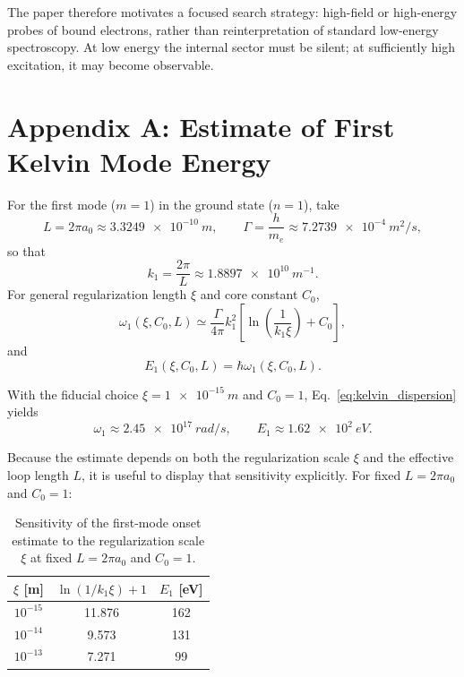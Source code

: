 \documentclass[pdflatex,sn-mathphys-num]{sn-jnl}
\begin{document}
        The paper therefore motivates a focused search strategy: high-field or high-energy probes of bound electrons, rather than reinterpretation of standard low-energy spectroscopy. At low energy the internal sector must be silent; at sufficiently high excitation, it may become observable.

        \appendix
    \section*{Appendix A: Estimate of First Kelvin Mode Energy}\label{app:first_kelvin}
        For the first mode ($m=1$) in the ground state ($n=1$), take
        \begin{equation}
            L = 2\pi a_0 \approx \SI{3.3249e-10}{m},
            \qquad
            \Gamma = \frac{h}{m_e} \approx \SI{7.2739e-4}{m^2/s},
        \end{equation}
        so that
        \begin{equation}
            k_1 = \frac{2\pi}{L} \approx \SI{1.8897e10}{m^{-1}}.
        \end{equation}
        For general regularization length $\xi$ and core constant $C_0$,
        \begin{equation}
            \omega_1(\xi,C_0,L)
            \simeq
            \frac{\Gamma}{4\pi} k_1^2
            \left[
                \ln\!\left(\frac{1}{k_1 \xi}\right) + C_0
            \right],
        \end{equation}
        and
        \begin{equation}
            E_1(\xi,C_0,L)=\hbar \omega_1(\xi,C_0,L).
        \end{equation}

        With the fiducial choice $\xi=\SI{1e-15}{m}$ and $C_0=1$, Eq.~\eqref{eq:kelvin_dispersion} yields
        \begin{equation}
            \omega_1 \approx \SI{2.45e17}{rad/s},
            \qquad
            E_1 \approx \SI{1.62e2}{eV}.
        \end{equation}

        Because the estimate depends on both the regularization scale $\xi$ and the effective loop length $L$, it is useful to display that sensitivity explicitly. For fixed $L=2\pi a_0$ and $C_0=1$:
        \begin{table}[htbp]
            \centering
            \caption{Sensitivity of the first-mode onset estimate to the regularization scale $\xi$ at fixed $L=2\pi a_0$ and $C_0=1$.}
            \begin{tabular}{ccc}
                \toprule
                $\xi$ [m] & $\ln(1/k_1\xi)+1$ & $E_1$ [eV] \\
                \midrule
                $10^{-15}$ & 11.876 & 162 \\
                $10^{-14}$ & 9.573  & 131 \\
                $10^{-13}$ & 7.271  & 99  \\
                \bottomrule
            \end{tabular}
            \label{tab:xi-sensitivity}
        \end{table}
\end{document}
